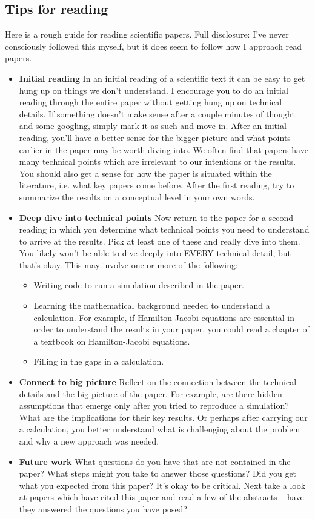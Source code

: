\documentclass{amsart}
\begin{document}
\subsection{Tips for reading}

Here is a rough guide for reading scientific papers. Full disclosure: I've never consciously followed this myself, but it does seem to follow how I approach read papers. 

\begin{itemize}
\item {\bf Initial reading} In an initial reading of a scientific text it can be easy to get hung up on things we don't understand. I encourage you to do an initial reading through the entire paper without getting hung up on technical details. If something doesn't make sense after a couple minutes of thought and some googling, simply mark it as such and move in. After an initial reading, you'll have a better sense for the bigger picture and what points earlier in the paper may be worth diving into. We often find that papers have many technical points which are irrelevant to our intentions or the results. You should also get a sense for how the paper is situated within the literature, i.e. what key papers come before. 
After the first reading, try to summarize the results on a conceptual level in your own words.
\item{\bf Deep dive into technical points} Now return to the paper for a second reading in which you determine what technical points you need to understand to arrive at the results. Pick at least one of these and really dive into them. You likely won't be able to dive deeply into EVERY technical detail, but that's okay. This may involve one or more of the following:
\begin{itemize}
\item  Writing code to run a simulation described in the paper.  
\item  Learning the mathematical background needed to understand a calculation. For example, if Hamilton-Jacobi equations are essential in order to understand the results in your paper, you could read a chapter of a textbook on Hamilton-Jacobi equations.   \item Filling in the gaps in a calculation.
\end{itemize}
\item  {\bf Connect to big picture} Reflect on the connection between the technical details and the big picture of the paper. For example, are there hidden assumptions that emerge only after you tried to reproduce a simulation? What are the implications for their key results. Or perhaps after carrying our a calculation, you better understand what is challenging about the problem and why a new approach was needed.
\item  {\bf Future work}  What questions do you have that are not contained in the paper?  What steps might you take to answer those questions? Did you get what you expected from this paper? It's okay to be critical. Next take a look at papers which have cited this paper and read a few of the abstracts -- have they answered the questions you have posed?
\end{itemize}
\end{document}
